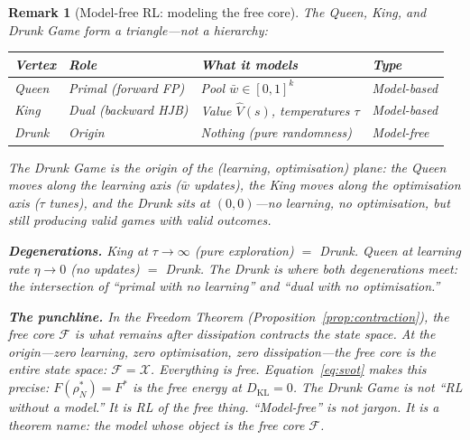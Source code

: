 \documentclass[11pt,a4paper]{article}
\newtheorem{remark}[theorem]{Remark}
\newcommand{\cF}{\mathcal{F}}
\newcommand{\cX}{\mathcal{X}}
\newcommand{\DKL}{D_{\mathrm{KL}}}
\begin{document}
\begin{remark}[Model-free RL\@: modeling the free core]%
\label{rem:model-free}
\color{black!60}%
The Queen, King, and Drunk Game form a triangle---not
a hierarchy:
\begin{center}
\small
\begin{tabular}{@{}llll@{}}
\toprule
\textbf{Vertex} & \textbf{Role} &
\textbf{What it models} & \textbf{Type} \\
\midrule
Queen & Primal (forward FP) &
  Pool $\bar{w} \in [0,1]^k$ &
  Model-based \\
King & Dual (backward HJB) &
  Value $\hat{V}(s)$, temperatures $\tau$ &
  Model-based \\
Drunk & Origin &
  Nothing (pure randomness) &
  Model-free \\
\bottomrule
\end{tabular}
\end{center}
\noindent
The Drunk Game is the \emph{origin} of the
(learning, optimisation) plane:
the Queen moves along the learning axis
($\bar{w}$ updates),
the King moves along the optimisation axis
($\tau$ tunes),
and the Drunk sits at $(0, 0)$---no learning,
no optimisation, but still producing valid games
with valid outcomes.

\medskip\noindent
\textbf{Degenerations.}\;
King at $\tau \to \infty$ (pure exploration) $=$ Drunk.
Queen at learning rate $\eta \to 0$ (no updates) $=$ Drunk.
The Drunk is where both degenerations meet:
the intersection of ``primal with no learning'' and
``dual with no optimisation.''

\medskip\noindent
\textbf{The punchline.}\;
In the Freedom Theorem
(Proposition~\ref{prop:contraction}),
the free core $\cF$ is what remains after dissipation
contracts the state space.
At the origin---zero learning, zero optimisation,
zero dissipation---the free core is the \emph{entire}
state space: $\cF = \cX$.
Everything is free.
Equation~\eqref{eq:svot} makes this precise:
$F(\rho^*_N) = F^*$ is the free energy at
$\DKL = 0$.
The Drunk Game is not ``RL without a model.''
It is RL \emph{of} the free thing.
``Model-free'' is not jargon.
It is a theorem name:
\emph{the model whose object is the free core $\cF$}.
\end{remark}
\end{document}
